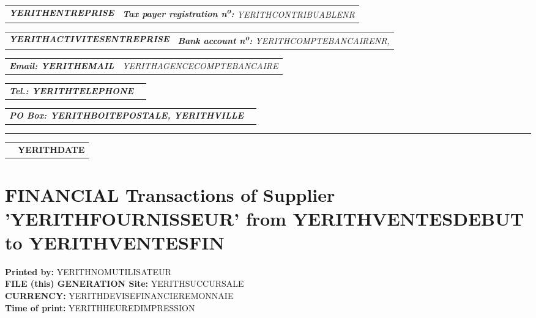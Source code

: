 \documentclass[16pt,YERITHPAPERSPEC]{article} %
\makeatletter
\newcommand{\headerrow}[2]
{\begin{tabular*}{\linewidth}{l@{\extracolsep{\fill}}r}
	#1 &
	#2 \\
\end{tabular*}}
\newcommand{\emphbold}[1]{\textbf{\emph{#1}}\xspace}
\makeatother
\begin{document}
\bigskip

\headerrow
	{\emphbold{YERITHENTREPRISE}}
	{\emph{\textbf{Tax payer registration n\textsuperscript{o}:} YERITHCONTRIBUABLENR}}
\headerrow
	{\emphbold{YERITHACTIVITESENTREPRISE}}
	{\emph{\textbf{Bank account n\textsuperscript{o}:} YERITHCOMPTEBANCAIRENR,}}
\headerrow
	{\emphbold{Email: YERITHEMAIL}}
	{\emph{YERITHAGENCECOMPTEBANCAIRE}}
\headerrow
	{\emphbold{Tel.: YERITHTELEPHONE}}
	{}
\headerrow
	{\emphbold{PO Box: YERITHBOITEPOSTALE, YERITHVILLE}}
	{}
	
\hrule

\headerrow
	{}
	{\textbf{YERITHDATE}}

\section*{FINANCIAL Transactions of Supplier 'YERITHFOURNISSEUR' from YERITHVENTESDEBUT to YERITHVENTESFIN}

\textbf{Printed by:} YERITHNOMUTILISATEUR\\
\textbf{FILE (this) GENERATION Site:} YERITHSUCCURSALE\\
\textbf{CURRENCY:} YERITHDEVISEFINANCIEREMONNAIE\\
\textbf{Time of print:} YERITHHEUREDIMPRESSION

\vspace{0.3cm}
\end{document}
